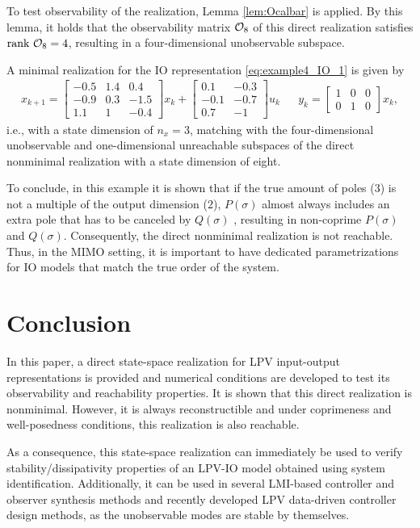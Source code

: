 To test observability of the realization, Lemma \ref{lem:Ocalbar} is applied. By this lemma, it holds that the observability matrix $\mathcal{O}_8$ of this direct realization satisfies $\textrm{rank}\ \mathcal{O}_8 = 4$, resulting in a four-dimensional unobservable subspace.

A minimal realization for the IO representation \eqref{eq:example4_IO_1} is given by \cite{Alsalti2023}
\begin{align}\label{eq:SS_example4}
    x_{k+1} = \left[\begin{array}{ccc} -0.5 & 1.4 & 0.4\\ -0.9 & 0.3 & -1.5\\ 1.1 & 1 & -0.4 \end{array}\right] x_k + \left[\begin{array}{cc} 0.1 & -0.3\\ -0.1 & -0.7\\ 0.7 & -1 \end{array}\right] u_k & & 
    y_k =  \left[\begin{array}{ccc} 1 & 0 & 0\\ 0 & 1 & 0 \end{array}\right] x_k,
\end{align}
i.e., with a state dimension of $n_x=3$, matching with the four-dimensional unobservable and one-dimensional unreachable subspaces of the direct nonminimal realization with a state dimension of eight. 

To conclude, in this example it is shown that if the true amount of poles ($3$) is not a multiple of the output dimension ($2$),  $P(\sigma)$ almost always includes an extra pole that has to be canceled by $Q(\sigma)$ \cite{Gevers1986}, resulting in non-coprime $P(\sigma)$ and $Q(\sigma)$. Consequently, the direct nonminimal realization is not reachable. Thus, in the MIMO setting, it is important to have dedicated parametrizations for IO models that match the true order of the system.

\section{Conclusion}
In this paper, a direct state-space realization for LPV input-output representations is provided and numerical conditions are developed to test its observability and reachability properties. It is shown that this direct realization is nonminimal. However, it is always reconstructible and under coprimeness and well-posedness conditions, this realization is also reachable. 

As a consequence, this state-space realization can immediately be used to verify stability/dissipativity properties of an LPV-IO model obtained using system identification. Additionally, it can be used in several LMI-based controller and observer synthesis methods and recently developed LPV data-driven controller design methods, as the unobservable modes are stable by themselves.